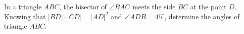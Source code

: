 In a triangle $ABC$,  the bisector of $\angle BAC$ meets the side $BC$ at the point $D$. Knowing that $|BD|\cdot |CD|=|AD|^2$ and $\angle ADB=45^{\circ}$,  determine the angles of triangle $ABC$.